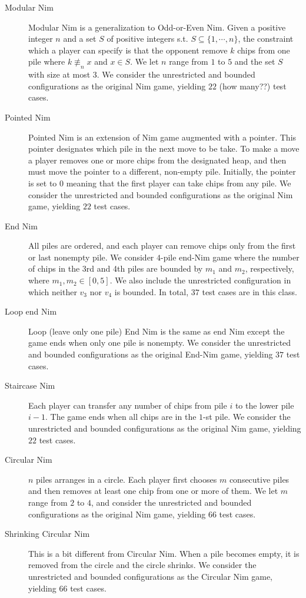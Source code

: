 \documentclass[review]{elsarticle}
\newcommand{\set}[1]{\{ #1 \}}
\newcommand{\nmodulo}{\not \equiv}
\begin{document}
\begin{description}
	\item[Modular Nim]
	Modular Nim is a generalization to Odd-or-Even Nim.
	Given a positive integer $n$ and a set $S$ of positive integers s.t. $S \subseteq \set{1, \cdots, n}$, the constraint which a player can specify is that the opponent remove $k$ chips from one pile where $k \nmodulo_n x$ and $x \in S$.
	We let $n$ range from $1$ to $5$ and the set $S$ with size at most $3$.
	We consider the unrestricted and bounded configurations as the original	Nim game, yielding $22$ (how many??) test cases.
	
	\item[Pointed Nim]
	Pointed Nim is an extension of Nim game augmented with a pointer.
	This pointer designates which pile in the next move to be take. 
	To make a move a player removes one or more chips from the designated heap, and then must move the pointer to a different, non-empty pile. 
	Initially, the pointer is set to $0$ meaning that the first player can take chips from any pile.
	We consider the unrestricted and bounded configurations as the original	Nim game, yielding $22$ test cases.	
	
	\item[End Nim]
	All piles are ordered, and each player can remove chips only from the first or last nonempty pile.
	We consider $4$-pile end-Nim game where the number of chips in the 3rd and 4th piles are bounded by $m_1$ and $m_2$, respectively, where $m_1, m_2 \in [0, 5]$.
	We also include the unrestricted configuration in which neither $v_3$ nor $v_4$ is bounded.
	In total, $37$ test cases are in this class.
	
	\item[Loop end Nim]
	Loop (leave only one pile) End Nim is the same as end Nim except the game ends when only one pile is nonempty.
	We consider the unrestricted and bounded configurations as the original	End-Nim game, yielding $37$ test cases.
	
	\item[Staircase Nim]
	Each player can transfer any number of chips from pile $i$ to the lower pile $i - 1$.
	The game ends when all chips are in the $1$-st pile.
	We consider the unrestricted and bounded configurations as the original	Nim game, yielding $22$ test cases.	
	
	\item[Circular Nim]
	$n$ piles arranges in a circle.
	Each player first chooses $m$ consecutive piles and then removes at least one chip from one or more of them.
	We let $m$ range from $2$ to $4$, and consider the unrestricted and bounded configurations as the original Nim game, yielding $66$ test cases.
	
	\item[Shrinking Circular Nim]
	This is a bit different from Circular Nim.
	When a pile becomes empty, it is removed from the circle and the circle shrinks.
	We consider the unrestricted and bounded configurations as the Circular Nim game, yielding $66$ test cases.
\end{description}
\end{document}

